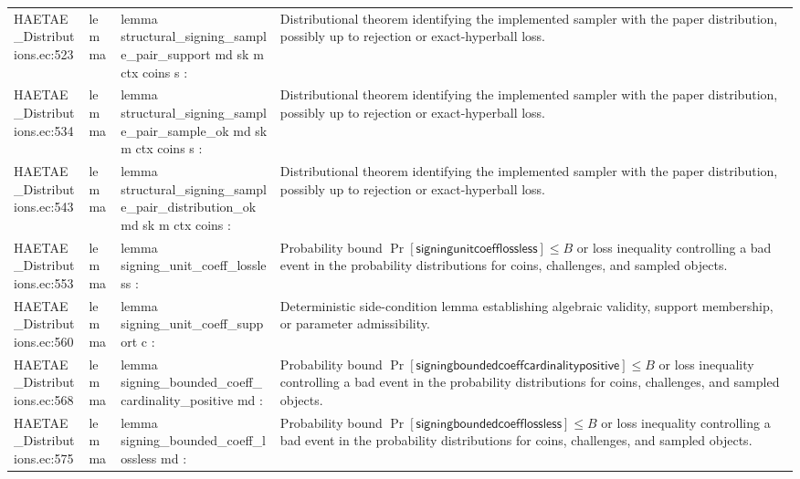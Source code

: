 \documentclass[10pt]{article}
\begin{document}
\begin{longtable}{L{0.11\textwidth}L{0.055\textwidth}L{0.385\textwidth}L{0.41\textwidth}}
HAETAE\_\allowbreak{}Distributions.\allowbreak{}ec:\allowbreak{}523 & lemma & {\ttfamily\scriptsize lemma structural\_\allowbreak{}signing\_\allowbreak{}sample\_\allowbreak{}pair\_\allowbreak{}support md sk m ctx coins s :} & Distributional theorem identifying the implemented sampler with the paper distribution, possibly up to rejection or exact-hyperball loss. \\
HAETAE\_\allowbreak{}Distributions.\allowbreak{}ec:\allowbreak{}534 & lemma & {\ttfamily\scriptsize lemma structural\_\allowbreak{}signing\_\allowbreak{}sample\_\allowbreak{}pair\_\allowbreak{}sample\_\allowbreak{}ok md sk m ctx coins s :} & Distributional theorem identifying the implemented sampler with the paper distribution, possibly up to rejection or exact-hyperball loss. \\
HAETAE\_\allowbreak{}Distributions.\allowbreak{}ec:\allowbreak{}543 & lemma & {\ttfamily\scriptsize lemma structural\_\allowbreak{}signing\_\allowbreak{}sample\_\allowbreak{}pair\_\allowbreak{}distribution\_\allowbreak{}ok md sk m ctx coins :} & Distributional theorem identifying the implemented sampler with the paper distribution, possibly up to rejection or exact-hyperball loss. \\
HAETAE\_\allowbreak{}Distributions.\allowbreak{}ec:\allowbreak{}553 & lemma & {\ttfamily\scriptsize lemma signing\_\allowbreak{}unit\_\allowbreak{}coeff\_\allowbreak{}lossless :} & Probability bound $\Pr[\mathsf{signingunitcoefflossless}]\le B$ or loss inequality controlling a bad event in the probability distributions for coins, challenges, and sampled objects. \\
HAETAE\_\allowbreak{}Distributions.\allowbreak{}ec:\allowbreak{}560 & lemma & {\ttfamily\scriptsize lemma signing\_\allowbreak{}unit\_\allowbreak{}coeff\_\allowbreak{}support c :} & Deterministic side-condition lemma establishing algebraic validity, support membership, or parameter admissibility. \\
HAETAE\_\allowbreak{}Distributions.\allowbreak{}ec:\allowbreak{}568 & lemma & {\ttfamily\scriptsize lemma signing\_\allowbreak{}bounded\_\allowbreak{}coeff\_\allowbreak{}cardinality\_\allowbreak{}positive md :} & Probability bound $\Pr[\mathsf{signingboundedcoeffcardinalitypositive}]\le B$ or loss inequality controlling a bad event in the probability distributions for coins, challenges, and sampled objects. \\
HAETAE\_\allowbreak{}Distributions.\allowbreak{}ec:\allowbreak{}575 & lemma & {\ttfamily\scriptsize lemma signing\_\allowbreak{}bounded\_\allowbreak{}coeff\_\allowbreak{}lossless md :} & Probability bound $\Pr[\mathsf{signingboundedcoefflossless}]\le B$ or loss inequality controlling a bad event in the probability distributions for coins, challenges, and sampled objects. \\

\end{longtable}
\end{document}
